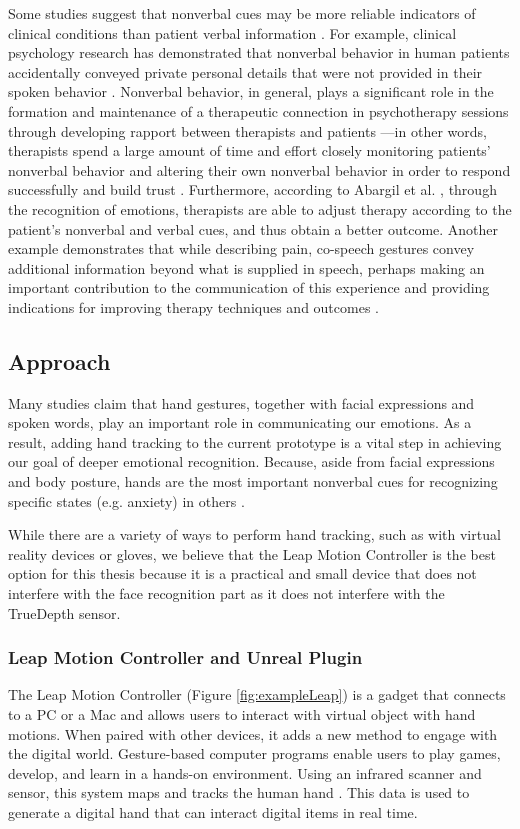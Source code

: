 Some studies suggest that nonverbal cues may be more reliable indicators of clinical conditions than patient verbal information \cite{KNA13}. For example, clinical psychology research has demonstrated that nonverbal behavior in human patients accidentally conveyed private personal details that were not provided in their spoken behavior \cite{FAB06, KLE03}. Nonverbal behavior, in general, plays a significant role in the formation and maintenance of a therapeutic connection in psychotherapy sessions through developing rapport between therapists and patients \cite{KLE03}—in other words, therapists spend a large amount of time and effort closely monitoring patients' nonverbal behavior and altering their own nonverbal behavior in order to respond successfully and build trust \cite{ABA21}. Furthermore, according to Abargil et al. \cite{ABA21}, through the recognition of emotions, therapists are able to adjust therapy according to the patient's nonverbal and verbal cues, and thus obtain a better outcome. Another example demonstrates that while describing pain, co-speech gestures convey additional information beyond what is supplied in speech, perhaps making an important contribution to the communication of this experience and providing indications for improving therapy techniques and outcomes \cite{ROW16, REI22}.

\subsection{Approach}
Many studies claim that hand gestures, together with facial expressions and spoken words, play an important role in communicating our emotions. As a result, adding hand tracking to the current prototype is a vital step in achieving our goal of deeper emotional recognition. Because, aside from facial expressions and body posture, hands are the most important nonverbal cues for recognizing specific states (e.g. anxiety) in others \cite{WAX97, REI22}.

While there are a variety of ways to perform hand tracking, such as with virtual reality devices or gloves, we believe that the Leap Motion Controller is the best option for this thesis because it is a practical and small device that does not interfere with the face recognition part as it does not interfere with the TrueDepth sensor.

\subsubsection{Leap Motion Controller and Unreal Plugin}
The Leap Motion Controller (Figure \ref{fig:exampleLeap}) is a gadget that connects to a PC or a Mac and allows users to interact with virtual object with hand motions. When paired with other devices, it adds a new method to engage with the digital world. Gesture-based computer programs enable users to play games, develop, and learn in a hands-on environment. Using an infrared scanner and sensor, this system maps and tracks the human hand \cite{LEAPROD}. This data is used to generate a digital hand that can interact digital items in real time.

